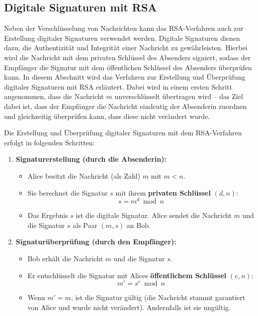 \subsection{Digitale Signaturen mit \texorpdfstring{\acrshort{RSA}}{RSA}}
Neben der Verschlüsselung von Nachrichten kann das \gls{RSA}-Verfahren auch zur Erstellung digitaler Signaturen verwendet werden. Digitale Signaturen dienen dazu, die Authentizität und Integrität einer Nachricht zu gewährleisten. Hierbei wird die Nachricht mit dem privaten Schlüssel des Absenders signiert, sodass der Empfänger die Signatur mit dem öffentlichen Schlüssel des Absenders überprüfen kann. In diesem Abschnitt wird das Verfahren zur Erstellung und Überprüfung digitaler Signaturen mit \gls{RSA} erläutert. Dabei wird in einem ersten Schritt angenommen, dass die Nachricht $m$ unverschlüsselt übertragen wird -- das Ziel dabei ist, dass der Empfänger die Nachricht eindeutig der Absenderin zuordnen und gleichzeitig überprüfen kann, dass diese nicht verändert wurde.

\begin{myprocedure}
	Die Erstellung und Überprüfung digitaler Signaturen mit dem \gls{RSA}-Verfahren erfolgt in folgenden Schritten:
	\begin{enumerate}
		\item \textbf{Signaturerstellung (durch die Absenderin):}
		      \begin{itemize}
			      \item Alice besitzt die Nachricht (als Zahl) $m$ mit $m < n$.
			      \item Sie berechnet die Signatur $s$ mit ihrem \textbf{privaten Schlüssel} $(d, n)$:
			            \[
				            s = m^d \bmod n
			            \]
			      \item Das Ergebnis $s$ ist die digitale Signatur. Alice sendet die Nachricht $m$ und die Signatur $s$ als Paar $(m, s)$ an Bob.
		      \end{itemize}
		\item \textbf{Signaturüberprüfung (durch den Empfänger):}
		      \begin{itemize}
			      \item Bob erhält die Nachricht $m$ und die Signatur $s$.
			      \item Er entschlüsselt die Signatur mit Alices \textbf{öffentlichem Schlüssel} $(e, n)$:
			            \[
				            m' = s^e \bmod n
			            \]
			      \item Wenn $m' = m$, ist die Signatur gültig (die Nachricht stammt garantiert von Alice und wurde nicht verändert). Andernfalls ist sie ungültig.
		      \end{itemize}
	\end{enumerate}
\end{myprocedure}

